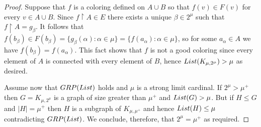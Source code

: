 \documentclass[10pt,a4paper]{amsart}
\begin{document}
\begin{proof}
Suppose that $f$ is a coloring defined on $A\cup B$ so that $f(v)\in F(v)$ for every $v\in A\cup B$.
Since $f\upharpoonright{A}\in E$ there exists a unique $\beta\in 2^\mu$ such that $f\upharpoonright{A}=g_\beta$.
It follows that $f(b_\beta)\in F(b_\beta)=\{g_\beta(\alpha):\alpha\in\mu\}=\{f(a_\alpha):\alpha\in\mu\}$, so for some $a_\alpha\in A$ we have $f(b_\beta)=f(a_\alpha)$.
This fact shows that $f$ is not a good coloring since every element of $A$ is connected with every element of $B$, hence ${\rm List}(K_{\mu,2^\mu})>\mu$ as desired.

Assume now that ${\rm GRP}({\rm List})$ holds and $\mu$ is a strong limit cardinal.
If $2^\mu>\mu^+$ then $G=K_{\mu,2^\mu}$ is a graph of size greater than $\mu^+$ and ${\rm List}(G)>\mu$.
But if $H\leq G$ and $|H|=\mu^+$ then $H$ is a subgraph of $K_{\mu,\mu^+}$ and hence ${\rm List}(H)\leq\mu$ contradicting ${\rm GRP}({\rm List})$.
We conclude, therefore, that $2^\mu=\mu^+$ as required.
\end{proof}
\end{document}
